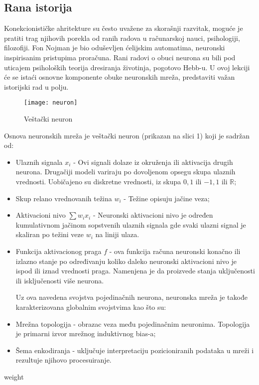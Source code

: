 \documentclass[fontsize=11bp, paper=a4]{scrarticle}
\begin{document}
\subsection{Rana istorija}


Konekcionističke ahritekture su često uvažene za skorašnji razvitak, moguće je pratiti trag njihovih porekla od ranih radova u računarskoj nauci, psihologiji, filozofiji. Fon Nojman je bio oduševljen ćelijskim automatima, neuronski inspirisanim pristupima proračuna. Rani radovi o obuci neurona su bili pod uticajem psiholoških teorija dresiranja životinja, pogotovo Hebb-u. U ovoj lekciji će se istaći osnovne komponente obuke neuronskih mreža, predstaviti važan istorijski rad u polju. 

\begin{figure}[h!]
    \centering
    \texttt{[image: neuron]}
    \caption{Veštački neuron}
\end{figure}

Osnova neuronskih mreža je veštački neuron (prikazan na slici 1) koji je sadržan od:
\begin{itemize}
    \item Ulaznih signala $x_i$ - Ovi signali dolaze iz okruženja ili aktivacija drugih neurona. Drugačiji modeli variraju po dovoljenom opsegu skupa ulaznih vrednosti. Uobičajeno su diskretne vrednosti, iz skupa ${0,1}$ ili ${-1,1}$ ili $\mathbb{R}$;
    \item Skup relano vrednovanih težina $w_i$ - Težine opisuju jačine veza;
    \item Aktivacioni nivo $\sum {w_i x_i}$ - Neuronski aktivacioni nivo je određen kumulativnom jačinom sopstvenih ulaznih signala gde svaki ulazni signal je skaliran po težini veze $w_i$ na liniji ulaza. 
    \item Funkcija aktivacionog praga $f$ - ova funkcija računa neuronski konačno ili izlazno stanje po određivanju koliko daleko neuronski aktivacioni nivo je ispod ili iznad vrednosti praga. Namenjena je da proizvede stanja uključenosti ili isključenosti više neurona.
    
    Uz ova navedena svojstva pojedinačnih neurona, neuronska mreža je takođe karakterizovana globalnim svojstvima kao što su:
    \item Mrežna topologija - obrazac veza među pojedinačnim neuronima. Topologija je primarni izvor mrežnog induktivnog bias-a;
    \item Šema enkodiranja - uključuje interpretaciju pozicioniranih podataka u mreži i rezultuje njihovo procesuiranje.
\end{itemize} %
weight
\end{document}
